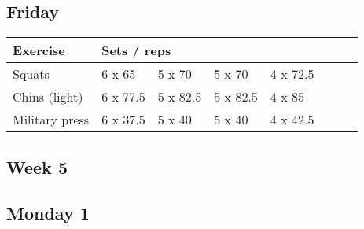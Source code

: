 \documentclass[12pt, a4paper]{article}%
\begin{document}
  \subsection*{\hspace{0.5em} Friday }


  \begin{tabular}{l|lllllll}
  \hspace{0.75em} \textbf{Exercise} & \multicolumn{ 7 }{l}{ \textbf{Sets / reps} } \\ \hline

            \hspace{0.75em} Squats
            & 6 x 65
            & 5 x 70
            & 5 x 70
            & 4 x 72.5
            & 
            & 
            & 
            \\


            \hspace{0.75em} Chins (light)
            & 6 x 77.5
            & 5 x 82.5
            & 5 x 82.5
            & 4 x 85
            & 
            & 
            & 
            \\


            \hspace{0.75em} Military press
            & 6 x 37.5
            & 5 x 40
            & 5 x 40
            & 4 x 42.5
            & 
            & 
            & 
            \\


  \end{tabular}


\clearpage \subsection*{\hspace{0.25em} Week 5 }
  \subsection*{\hspace{0.5em} Monday 1 }
\end{document}
